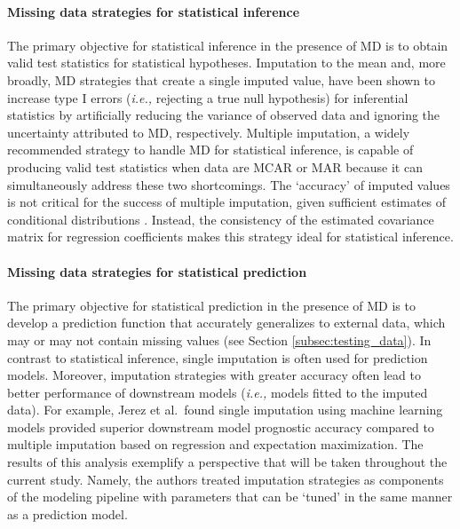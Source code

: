 \documentclass[AMA,STIX1COL,doublespace]{WileyNJD-v2}
\begin{document}
\paragraph{Missing data strategies for statistical inference}

The primary objective for statistical inference in the presence of MD is
to obtain valid test statistics for statistical hypotheses. Imputation
to the mean and, more broadly, MD strategies that create a single
imputed value, have been shown to increase type I errors
(\textit{i.e., }rejecting a true null hypothesis) for inferential
statistics by artificially reducing the variance of observed data and
ignoring the uncertainty attributed to MD, respectively. Multiple
imputation, a widely recommended strategy to handle MD for statistical
inference, is capable of producing valid test statistics when data are
MCAR or MAR because it can simultaneously address these two
shortcomings. The `accuracy' of imputed values is not critical for the
success of multiple imputation, given sufficient estimates of
conditional distributions \citep{van2018flexible}. Instead, the
consistency of the estimated covariance matrix for regression
coefficients makes this strategy ideal for statistical inference.

\paragraph{Missing data strategies for statistical prediction}

The primary objective for statistical prediction in the presence of MD
is to develop a prediction function that accurately generalizes to
external data, which may or may not contain missing values (see Section
\ref{subsec:testing_data}). In contrast to statistical inference, single
imputation is often used for prediction models.\citep{kuhn2019feature}
Moreover, imputation strategies with greater accuracy often lead to
better performance of downstream models (\textit{i.e., }models fitted to
the imputed data). For example, Jerez et al.~found single imputation
using machine learning models provided superior downstream model
prognostic accuracy compared to multiple imputation based on regression
and expectation maximization.\citep{jerez2010missing} The results of
this analysis exemplify a perspective that will be taken throughout the
current study. Namely, the authors treated imputation strategies as
components of the modeling pipeline with parameters that can be `tuned'
in the same manner as a prediction model.
\end{document}
